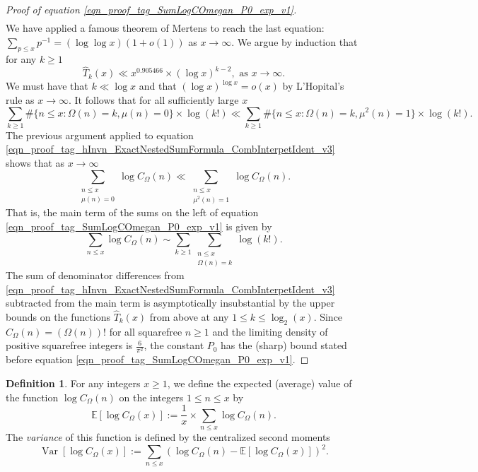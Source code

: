 \documentclass[11pt,reqno,a4letter]{article}
\numberwithin{equation}{section}
\numberwithin{figure}{section}
\numberwithin{table}{section}
\theoremstyle{plain}
\numberwithin{theorem}{section}
\theoremstyle{definition}
\newtheorem{definition}[theorem]{Definition}
\begin{document}
\begin{proof}[Proof of equation \eqref{eqn_proof_tag_SumLogCOmegan_P0_exp_v1}]
\begin{align*}
\end{align*}
We have applied a famous theorem of Mertens to reach the last equation: 
$\sum_{p \leq x} p^{-1} = (\log\log x)(1+o(1))$ as $x \rightarrow \infty$. 
We argue by induction that for any $k \geq 1$
\[
\widehat{T}_k(x) \ll x^{0.905466} \times (\log x)^{k-2}, 
	\text{ as } x \rightarrow \infty. 
\]
We must have that $k \ll \log x$ and that 
$(\log x)^{\log x} = o\left(x\right)$ by L'Hopital's rule as 
$x \rightarrow \infty$. 
It follows that for all sufficiently large $x$ 
\[
\sum_{k \geq 1} \#\{n \leq x: \Omega(n)=k, \mu(n)=0\} \times \log(k!) \ll 
     \sum_{k \geq 1} \#\{n \leq x: \Omega(n)=k, \mu^2(n)=1\} \times \log(k!). 
\]
The previous argument applied to 
equation \eqref{eqn_proof_tag_hInvn_ExactNestedSumFormula_CombInterpetIdent_v3} 
shows that as $x \rightarrow \infty$ 
\[
\sum_{\substack{n \leq x \\ \mu(n)=0}} \log C_{\Omega}(n) \ll 
     \sum_{\substack{n \leq x \\ \mu^2(n)=1}} \log C_{\Omega}(n). 
\]
That is, the main term of the sums on the left of 
equation \eqref{eqn_proof_tag_SumLogCOmegan_P0_exp_v1} is given by 
\[
\sum_{n \leq x} \log C_{\Omega}(n) \sim \sum_{k \geq 1} \sum_{\substack{n \leq x \\ \Omega(n)=k}} \log(k!). 
\]
The sum of denominator differences from 
\eqref{eqn_proof_tag_hInvn_ExactNestedSumFormula_CombInterpetIdent_v3} subtracted from the 
main term is asymptotically insubstantial by the upper bounds on the functions 
$\widehat{T}_k(x)$ from above at any $1 \leq k \leq \log_2(x)$. 
Since $C_{\Omega}(n) = (\Omega(n))!$ for all squarefree $n \geq 1$ and the 
limiting density of positive squarefree integers is 
$\frac{6}{\pi^2}$, the constant $P_0$ has the (sharp) bound stated before 
equation \eqref{eqn_proof_tag_SumLogCOmegan_P0_exp_v1}. 
\end{proof}

\begin{definition}
\label{def_AvgOrder_FirstAndSecondMomentsOfFuncs_v1}
For any integers $x \geq 1$, we define the expected (average) value of the 
function $\log C_{\Omega}(n)$ on the integers $1 \leq n \leq x$ by 
\[
\mathbb{E}\left[\log C_{\Omega}(x)\right] := \frac{1}{x} \times \sum_{n \leq x} 
     \log C_{\Omega}(n). 
\]
The \emph{variance} of this function is defined by the 
centralized second moments 
\[
\operatorname{Var}\left[\log C_{\Omega}(x)\right] := 
	\sum_{n \leq x} \left(\log C_{\Omega}(n) - 
	\mathbb{E}\left[\log C_{\Omega}(x)\right]\right)^2. 
\]
\end{definition}
\end{document}
